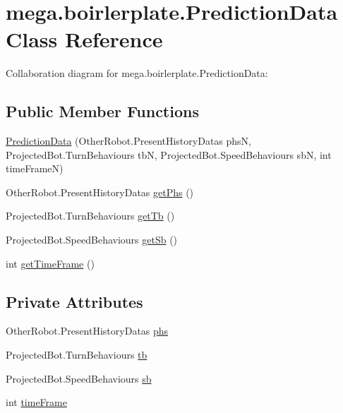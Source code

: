 \hypertarget{classmega_1_1boirlerplate_1_1_prediction_data}{}\section{mega.\+boirlerplate.\+Prediction\+Data Class Reference}
\label{classmega_1_1boirlerplate_1_1_prediction_data}


Collaboration diagram for mega.\+boirlerplate.\+Prediction\+Data\+:
\subsection*{Public Member Functions}
\begin{DoxyCompactItemize}
\item 
\hyperlink{classmega_1_1boirlerplate_1_1_prediction_data_a887ffcbb8e764520f205093f06d7194a}{Prediction\+Data} (Other\+Robot.\+Present\+History\+Datas phsN, Projected\+Bot.\+Turn\+Behaviours tbN, Projected\+Bot.\+Speed\+Behaviours sbN, int time\+FrameN)
\item 
Other\+Robot.\+Present\+History\+Datas \hyperlink{classmega_1_1boirlerplate_1_1_prediction_data_a974e0a518cc3c2cfc49f8a0705ec4330}{get\+Phs} ()
\item 
Projected\+Bot.\+Turn\+Behaviours \hyperlink{classmega_1_1boirlerplate_1_1_prediction_data_a1247004add226576ee0bd23f019457a9}{get\+Tb} ()
\item 
Projected\+Bot.\+Speed\+Behaviours \hyperlink{classmega_1_1boirlerplate_1_1_prediction_data_a6402313a3837d4995ea5031d082a8fde}{get\+Sb} ()
\item 
int \hyperlink{classmega_1_1boirlerplate_1_1_prediction_data_a01d74b9bc67539cc279f927624479544}{get\+Time\+Frame} ()
\end{DoxyCompactItemize}
\subsection*{Private Attributes}
\begin{DoxyCompactItemize}
\item 
Other\+Robot.\+Present\+History\+Datas \hyperlink{classmega_1_1boirlerplate_1_1_prediction_data_a9c4de05385d226b06ecd248c961da3ca}{phs}
\item 
Projected\+Bot.\+Turn\+Behaviours \hyperlink{classmega_1_1boirlerplate_1_1_prediction_data_a28c4b54db156041f9c59b34af0d0ce68}{tb}
\item 
Projected\+Bot.\+Speed\+Behaviours \hyperlink{classmega_1_1boirlerplate_1_1_prediction_data_ae99cdcb83dfb8e2c10af0de8f047d99c}{sb}
\item 
int \hyperlink{classmega_1_1boirlerplate_1_1_prediction_data_a1dac7e8a3dfbcb90b2f8fdf173435b19}{time\+Frame}
\end{DoxyCompactItemize}


